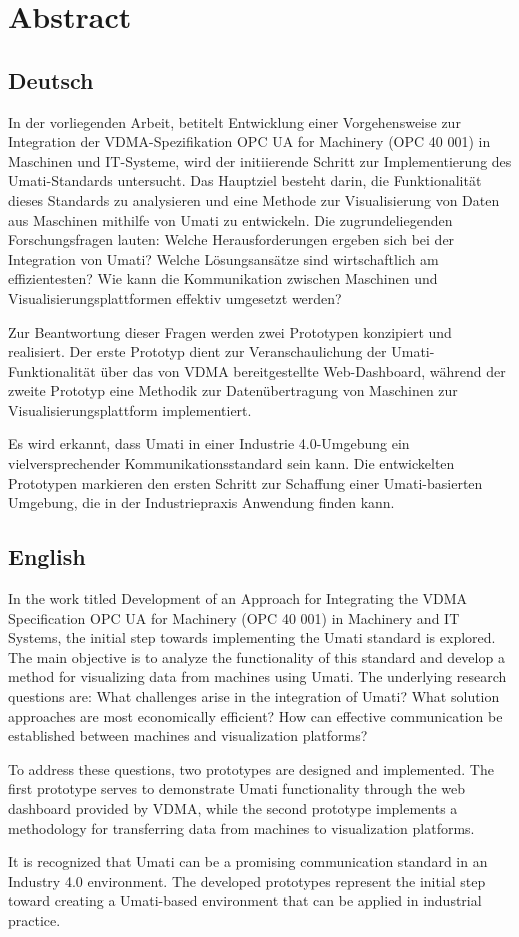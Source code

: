 \chapter*{Abstract}
\section*{Deutsch}

In der vorliegenden Arbeit, betitelt \glqq Entwicklung einer Vorgehensweise zur Integration der VDMA-Spezifikation \glq OPC UA for Machinery (OPC 40 001)\grq{} in Maschinen und IT-Systeme\grqq{}, wird der initiierende Schritt zur Implementierung des Umati-Standards untersucht. Das Hauptziel besteht darin, die Funktionalität dieses Standards zu analysieren und eine Methode zur Visualisierung von Daten aus Maschinen mithilfe von Umati zu entwickeln. Die zugrundeliegenden Forschungsfragen lauten: Welche Herausforderungen ergeben sich bei der Integration von Umati? Welche Lösungsansätze sind wirtschaftlich am effizientesten? Wie kann die Kommunikation zwischen Maschinen und Visualisierungsplattformen effektiv umgesetzt werden?

Zur Beantwortung dieser Fragen werden zwei Prototypen konzipiert und realisiert. Der erste Prototyp dient zur Veranschaulichung der Umati-Funktionalität über das von VDMA bereitgestellte Web-Dashboard, während der zweite Prototyp eine Methodik zur Datenübertragung von Maschinen zur Visualisierungsplattform implementiert.

Es wird erkannt, dass Umati in einer Industrie 4.0-Umgebung ein vielversprechender Kommunikationsstandard sein kann. Die entwickelten Prototypen markieren den ersten Schritt zur Schaffung einer Umati-basierten Umgebung, die in der Industriepraxis Anwendung finden kann.

\section*{English}

In the work titled \glqq Development of an Approach for Integrating the VDMA Specification \glq OPC UA for Machinery (OPC 40 001)\grq{} in Machinery and IT Systems\grqq{}, the initial step towards implementing the Umati standard is explored. The main objective is to analyze the functionality of this standard and develop a method for visualizing data from machines using Umati. The underlying research questions are: What challenges arise in the integration of Umati? What solution approaches are most economically efficient? How can effective communication be established between machines and visualization platforms?

To address these questions, two prototypes are designed and implemented. The first prototype serves to demonstrate Umati functionality through the web dashboard provided by VDMA, while the second prototype implements a methodology for transferring data from machines to visualization platforms.

It is recognized that Umati can be a promising communication standard in an Industry 4.0 environment. The developed prototypes represent the initial step toward creating a Umati-based environment that can be applied in industrial practice.